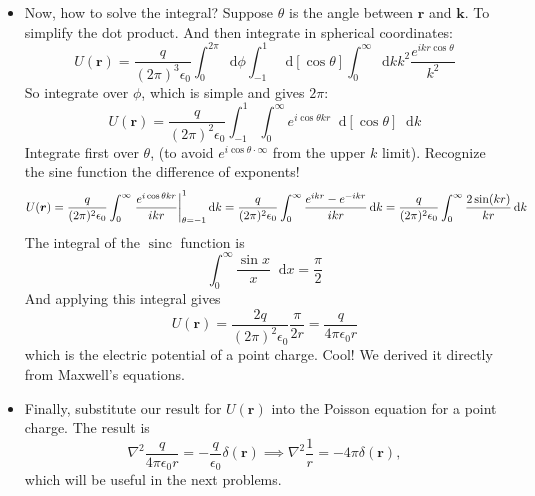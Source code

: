 \documentclass[11pt, a4paper]{article}
\newcommand{\diff}{\mathop{}\!\mathrm{d}} %
\renewcommand{\vec}[1]{\bm{#1}} %
\renewcommand{\r}{\vec{r}}
\newcommand{\ee}{\epsilon_{0}}  %
\renewcommand{\laplacian}{\nabla^{2}}
\begin{document}
\begin{itemize}
	\item Now, how to solve the integral? Suppose $ \theta $ is the angle between $ \r $ and $ \vec{k} $. To simplify the dot product. And then integrate in spherical coordinates:
	\begin{equation*}
		U(\r) =  \frac{q}{(2\pi)^{3}\ee} \int_{0}^{2\pi}\diff \phi \int_{-1}^{1} \diff [\cos \theta] \int_{0}^{\infty} \diff k k^{2} \frac{e^{ik r\cos \theta}}{k^{2}} 
	\end{equation*}
	So integrate over $ \phi $, which is simple and gives $ 2\pi $:
	\begin{equation*}
		U(\r) = \frac{q}{(2\pi)^{2}\ee} \int_{-1}^{1}\int_{0}^{\infty} e^{i \cos \theta k r} \diff[\cos \theta] \diff k
	\end{equation*}
	Integrate first over $ \theta $, (to avoid $ e^{i \cos \theta \cdot \infty} $ from the upper $ k $ limit). Recognize the sine function the difference of exponents!
	\begin{equation*}
		U(\r) = \frac{q}{(2\pi)^{2}\ee} \int_{0}^{\infty} \eval{\frac{e^{i \cos \theta k r}}{i k r}}_{\theta = -1}^{1} \diff k = \frac{q}{(2\pi)^{2}\ee} \int_{0}^{\infty}\frac{e^{ikr}-e^{-ikr}}{ikr} \diff k = \frac{q}{(2\pi)^{2}\ee} \int_{0}^{\infty}\frac{2\sin (kr)}{kr} \diff k
	\end{equation*}
	The integral of the $ \operatorname{sinc} $ function is
	\begin{equation*}
		\int_{0}^{\infty} \frac{\sin x}{x}\diff x = \frac{\pi}{2}
	\end{equation*}
	And applying this integral gives
	\begin{equation*}
		U(\r) = \frac{2q}{(2\pi)^{2}\ee}\frac{\pi}{2r} = \frac{q}{4\pi \ee r}
	\end{equation*}
	which is the electric potential of a point charge. Cool! We derived it directly from Maxwell's equations.
	
	\item Finally, substitute our result for $ U(\r) $ into the Poisson equation for a point charge. The result is
	\begin{equation*}
		\laplacian \frac{q}{4\pi \ee r} = -\frac{q}{\ee}\delta (\r) \implies \nabla^{2}\frac{1}{r} = - 4\pi \delta(\r),
	\end{equation*}
	which will be useful in the next problems. 
	
\end{itemize}
\end{document}
